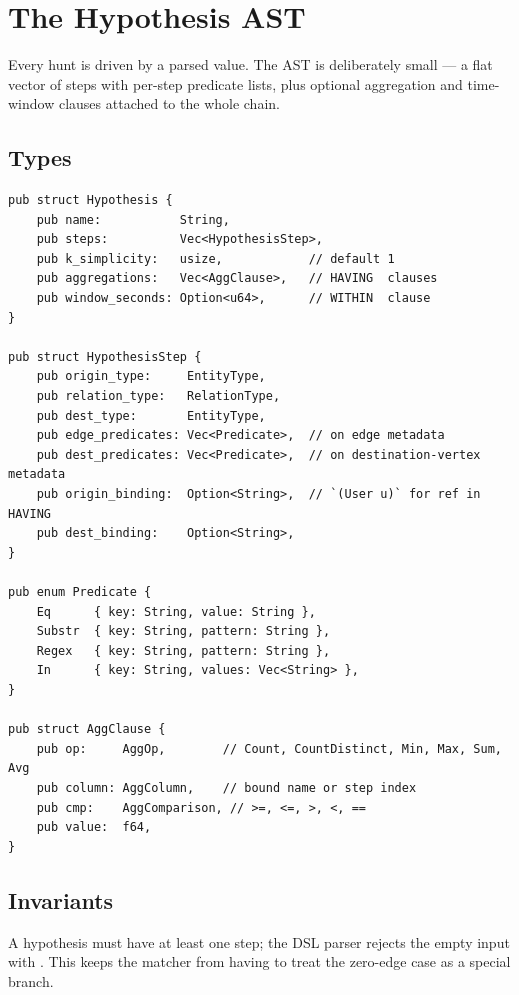 \chapter{The Hypothesis AST}
\label{ch:hypothesis}

Every hunt is driven by a parsed  value. The AST
is deliberately small --- a flat vector of steps with per-step
predicate lists, plus optional aggregation and time-window clauses
attached to the whole chain.

\section{Types}

\begin{lstlisting}[style=rust]
pub struct Hypothesis {
    pub name:           String,
    pub steps:          Vec<HypothesisStep>,
    pub k_simplicity:   usize,            // default 1
    pub aggregations:   Vec<AggClause>,   // HAVING  clauses
    pub window_seconds: Option<u64>,      // WITHIN  clause
}

pub struct HypothesisStep {
    pub origin_type:     EntityType,
    pub relation_type:   RelationType,
    pub dest_type:       EntityType,
    pub edge_predicates: Vec<Predicate>,  // on edge metadata
    pub dest_predicates: Vec<Predicate>,  // on destination-vertex metadata
    pub origin_binding:  Option<String>,  // `(User u)` for ref in HAVING
    pub dest_binding:    Option<String>,
}

pub enum Predicate {
    Eq      { key: String, value: String },
    Substr  { key: String, pattern: String },
    Regex   { key: String, pattern: String },
    In      { key: String, values: Vec<String> },
}

pub struct AggClause {
    pub op:     AggOp,        // Count, CountDistinct, Min, Max, Sum, Avg
    pub column: AggColumn,    // bound name or step index
    pub cmp:    AggComparison, // >=, <=, >, <, ==
    pub value:  f64,
}
\end{lstlisting}

\section{Invariants}

\begin{invariant}
A hypothesis must have at least one step; the DSL parser rejects
the empty input with . This keeps the
matcher from having to treat the zero-edge case as a special
branch.
\end{invariant}

